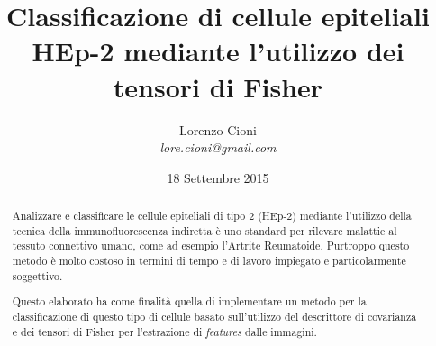 \documentclass[a4paper,12pt]{article}
\title{\bf Classificazione di cellule epiteliali HEp-2 mediante l'utilizzo dei tensori di Fisher}
\date {18 Settembre 2015}
\author{Lorenzo Cioni\\\textit{{\small lore.cioni@gmail.com}}}
\begin{document}
\maketitle

\begin{abstract}

Analizzare e classificare le cellule epiteliali di tipo 2 (HEp-2) mediante l'utilizzo della tecnica della immunofluorescenza indiretta è uno standard per rilevare malattie al tessuto connettivo umano, come ad esempio l'Artrite Reumatoide. Purtroppo questo metodo è molto costoso in termini di tempo e di lavoro impiegato e particolarmente soggettivo.

Questo elaborato ha come finalità quella di implementare un metodo per la classificazione di questo tipo di cellule basato sull'utilizzo del descrittore di covarianza e dei tensori di Fisher per l'estrazione di \emph{features} dalle immagini.
\end{abstract}

\tableofcontents









\end{document}
